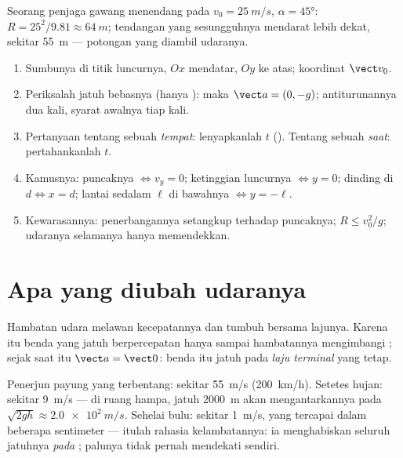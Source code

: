 \begin{example}\label{ex:g12:projectile-motion:kick}
Seorang penjaga gawang menendang pada $v_0 = \qty{25}{m/s}$, $\alpha = \ang{45}$:
$R = 25^2/9.81 \approx \qty{64}{m}$; tendangan yang sesungguhnya mendarat lebih
dekat, sekitar \qty{55}{m} --- potongan yang diambil udaranya.
\end{example}

\begin{method}\label{met:g12:projectile-motion:method}
\begin{enumerate}
  \item Sumbunya di titik luncurnya, $Ox$ mendatar, $Oy$ ke atas; koordinat
        $\vect v_0$.
  \item Periksalah jatuh bebasnya (hanya ): maka $\vect a = (0,-g)$;
        antiturunannya dua kali, syarat awalnya tiap kali.
  \item Pertanyaan tentang sebuah \emph{tempat}: lenyapkanlah $t$ ().
        Tentang sebuah \emph{saat}: pertahankanlah $t$.
  \item Kamusnya: puncaknya $\Leftrightarrow v_y = 0$; ketinggian luncurnya
        $\Leftrightarrow y = 0$; dinding di $d \Leftrightarrow x = d$; lantai
        sedalam $\ell$ di bawahnya $\Leftrightarrow y = -\ell$.
  \item Kewarasannya: penerbangannya setangkup terhadap puncaknya;
        $R \leq v_0^2/g$; udaranya selamanya hanya memendekkan.
\end{enumerate}
\end{method}

\section{Apa yang diubah udaranya}

\begin{definition}\label{def:g12:projectile-motion:terminal}
Hambatan udara melawan kecepatannya dan tumbuh bersama lajunya. Karena itu
benda yang jatuh berpercepatan hanya sampai hambatannya mengimbangi ;
sejak saat itu $\vect a = \vect 0$: benda itu jatuh pada \emph{laju
terminal} yang tetap.
\end{definition}

\begin{example}\label{ex:g12:projectile-motion:airorders}
Penerjun payung yang terbentang: sekitar \qty{55}{m/s} (\qty{200}{km/h}).
Setetes hujan: sekitar \qty{9}{m/s} --- di ruang hampa, jatuh \qty{2000}{m}
akan mengantarkannya pada $\sqrt{2gh} \approx \qty{2.0e2}{m/s}$. Sehelai
bulu: sekitar \qty{1}{m/s}, yang tercapai dalam beberapa sentimeter ---
itulah rahasia kelambatannya: ia menghabiskan seluruh jatuhnya \emph{pada}
; palunya tidak pernah mendekati  sendiri.
\end{example}

